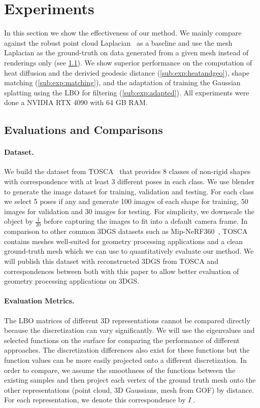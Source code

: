 \section{Experiments}
\label{sec:experiments}

In this section we show the effectiveness of our method. 
We mainly compare against the robust point cloud Laplacian~\cite{sharp2020nonmanifold} as a baseline and use the mesh Laplacian as the ground-truth on data generated from a given mesh instead of renderings only (see \cref{sub:exp:evaluation}).
We show superior performance on the computation of heat diffusion and the derivied geodesic distance (\cref{sub:exp:heatandgeo}), shape matching (\cref{sub:exp:matching}), and the adaptation of training the Gaussian splatting using the LBO for filtering (\cref{sub:exp:adapted}). 
All experiments were done a NVIDIA RTX 4090 with 64 GB RAM. 

\subsection{Evaluations and Comparisons}\label{sub:exp:evaluation}

\paragraph{Dataset.}
We build the dataset from TOSCA~\cite{MB08} that provides $8$ classes of non-rigid shapes with correspondence with at least 3 different poses in each class. We use blender to generate the image dataset for training, validation and testing. 
For each class we select 5 poses if any and generate 100 images of each shape for training, 50 images for validation and 30 images for testing. For simplicity, we downscale the object by $\frac{1}{20}$ before capturing the images to fit into a default camera frame.
In comparison to other common 3DGS datasets such as Mip-NeRF360~\cite{barron2022mip}, TOSCA contains meshes well-suited for geometry processing applications and a clean ground-truth mesh which we can use to quantitatively evaluate our method. 
We will publish this dataset with reconstructed 3DGS from TOSCA and correspondences between both with this paper to allow better evaluation of geometry processing applications on 3DGS.


\paragraph{Evaluation Metrics.}
The LBO matrices of different 3D representations cannot be compared directly because the discretization can vary significantly. 
We will use the eigenvalues and selected functions on the surface for comparing the performance of different approaches. 
The discretization differences also exist for these functions but the function values can be more easily projected onto a different discretization. 
In order to compare, we assume the smoothness of the functions between the existing samples and then project each vertex of the ground truth mesh onto the other representations (point cloud, 3D Gaussians, mesh from GOF) by distance. For each representation, we denote this correspondence by $I_\cdot$.

